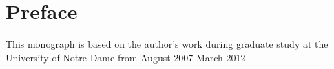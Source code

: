 \chapter*{Preface}
This monograph is based on the author's work during graduate study at the University of Notre Dame from August 2007-March 2012.


